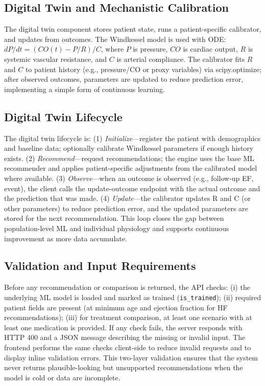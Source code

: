 \documentclass[conference]{IEEEtran}
\begin{document}
\subsection{Digital Twin and Mechanistic Calibration}
The digital twin component stores patient state, runs a patient-specific calibrator, and updates from outcomes. The Windkessel model is used with ODE: $dP/dt = (CO(t) - P/R)/C$, where $P$ is pressure, $CO$ is cardiac output, $R$ is systemic vascular resistance, and $C$ is arterial compliance. The calibrator fits $R$ and $C$ to patient history (e.g., pressure/CO or proxy variables) via scipy.optimize; after observed outcomes, parameters are updated to reduce prediction error, implementing a simple form of continuous learning.

\subsection{Digital Twin Lifecycle}
The digital twin lifecycle is: (1) \emph{Initialize}---register the patient with demographics and baseline data; optionally calibrate Windkessel parameters if enough history exists. (2) \emph{Recommend}---request recommendations; the engine uses the base ML recommender and applies patient-specific adjustments from the calibrated model where available. (3) \emph{Observe}---when an outcome is observed (e.g., follow-up EF, event), the client calls the update-outcome endpoint with the actual outcome and the prediction that was made. (4) \emph{Update}---the calibrator updates R and C (or other parameters) to reduce prediction error, and the updated parameters are stored for the next recommendation. This loop closes the gap between population-level ML and individual physiology and supports continuous improvement as more data accumulate.

\subsection{Validation and Input Requirements}
Before any recommendation or comparison is returned, the API checks: (i) the underlying ML model is loaded and marked as trained (\texttt{is\_trained}); (ii) required patient fields are present (at minimum age and ejection fraction for HF recommendations); (iii) for treatment comparison, at least one scenario with at least one medication is provided. If any check fails, the server responds with HTTP 400 and a JSON message describing the missing or invalid input. The frontend performs the same checks client-side to reduce invalid requests and to display inline validation errors. This two-layer validation ensures that the system never returns plausible-looking but unsupported recommendations when the model is cold or data are incomplete.
\end{document}
